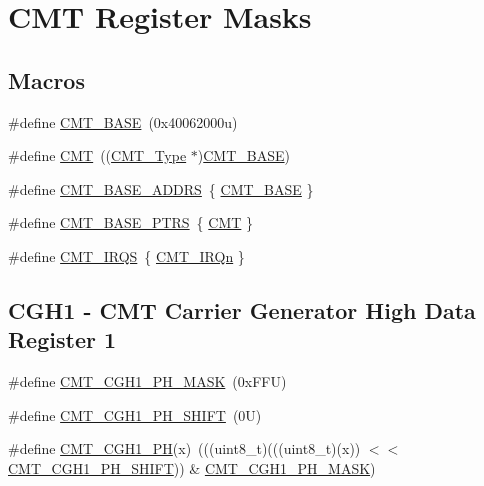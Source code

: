 \hypertarget{group___c_m_t___register___masks}{}\section{C\+MT Register Masks}
\label{group___c_m_t___register___masks}
\subsection*{Macros}
\begin{DoxyCompactItemize}
\item 
\#define \mbox{\hyperlink{group___c_m_t___register___masks_ga53e160517651b4460f52bf43fe1e197a}{C\+M\+T\+\_\+\+B\+A\+SE}}~(0x40062000u)
\item 
\#define \mbox{\hyperlink{group___c_m_t___register___masks_ga20a0cd761e563c3a1a75267b661ac5b8}{C\+MT}}~((\mbox{\hyperlink{struct_c_m_t___type}{C\+M\+T\+\_\+\+Type}} $\ast$)\mbox{\hyperlink{group___c_m_t___register___masks_ga53e160517651b4460f52bf43fe1e197a}{C\+M\+T\+\_\+\+B\+A\+SE}})
\item 
\#define \mbox{\hyperlink{group___c_m_t___register___masks_gad5658ec1717cf6b1a031581da622b98c}{C\+M\+T\+\_\+\+B\+A\+S\+E\+\_\+\+A\+D\+D\+RS}}~\{ \mbox{\hyperlink{group___c_m_t___register___masks_ga53e160517651b4460f52bf43fe1e197a}{C\+M\+T\+\_\+\+B\+A\+SE}} \}
\item 
\#define \mbox{\hyperlink{group___c_m_t___register___masks_gad58e606f11af35440c1b77ff05b55874}{C\+M\+T\+\_\+\+B\+A\+S\+E\+\_\+\+P\+T\+RS}}~\{ \mbox{\hyperlink{group___c_m_t___register___masks_ga20a0cd761e563c3a1a75267b661ac5b8}{C\+MT}} \}
\item 
\#define \mbox{\hyperlink{group___c_m_t___register___masks_ga6ead37abf997ee35670a9464ae7858bb}{C\+M\+T\+\_\+\+I\+R\+QS}}~\{ \mbox{\hyperlink{group___interrupt__vector__numbers_gga666eb0caeb12ec0e281415592ae89083a6850b1b7108ace2b7369a0f07a31db57}{C\+M\+T\+\_\+\+I\+R\+Qn}} \}
\end{DoxyCompactItemize}
\subsection*{C\+G\+H1 -\/ C\+MT Carrier Generator High Data Register 1}
\begin{DoxyCompactItemize}
\item 
\#define \mbox{\hyperlink{group___c_m_t___register___masks_ga4ca405c6721e302fabcb4ddcc7773f1a}{C\+M\+T\+\_\+\+C\+G\+H1\+\_\+\+P\+H\+\_\+\+M\+A\+SK}}~(0x\+F\+F\+U)
\item 
\#define \mbox{\hyperlink{group___c_m_t___register___masks_ga6021b3f0f356c06b50371a28bf83f27e}{C\+M\+T\+\_\+\+C\+G\+H1\+\_\+\+P\+H\+\_\+\+S\+H\+I\+FT}}~(0\+U)
\item 
\#define \mbox{\hyperlink{group___c_m_t___register___masks_gaab6db22ced1eff50005d7df4d1d6dc0f}{C\+M\+T\+\_\+\+C\+G\+H1\+\_\+\+PH}}(x)~(((uint8\+\_\+t)(((uint8\+\_\+t)(x)) $<$$<$ \mbox{\hyperlink{group___c_m_t___register___masks_ga6021b3f0f356c06b50371a28bf83f27e}{C\+M\+T\+\_\+\+C\+G\+H1\+\_\+\+P\+H\+\_\+\+S\+H\+I\+FT}})) \& \mbox{\hyperlink{group___c_m_t___register___masks_ga4ca405c6721e302fabcb4ddcc7773f1a}{C\+M\+T\+\_\+\+C\+G\+H1\+\_\+\+P\+H\+\_\+\+M\+A\+SK}})
\end{DoxyCompactItemize}
